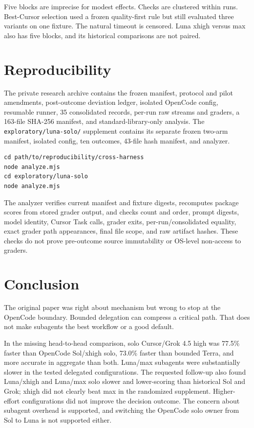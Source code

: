 \documentclass[11pt,oneside]{article}
\begin{document}
Five blocks are imprecise for modest effects. Checks are clustered within runs.
Best-Cursor selection used a frozen quality-first rule but still evaluated
three variants on one fixture. The natural timeout is censored. Luna xhigh
versus max also has five blocks, and its historical comparisons are not paired.

\section{Reproducibility}

The private research archive contains the frozen manifest, protocol and pilot amendments,
post-outcome deviation ledger, isolated OpenCode config, resumable runner, 35
consolidated records, per-run raw streams and graders, a 163-file SHA-256
manifest, and standard-library-only analysis. The
\texttt{exploratory/luna-solo/} supplement contains its separate frozen two-arm
manifest, isolated config, ten outcomes, 43-file hash manifest, and analyzer.

\begin{lstlisting}[style=config]
cd path/to/reproducibility/cross-harness
node analyze.mjs
cd exploratory/luna-solo
node analyze.mjs
\end{lstlisting}

The analyzer verifies current manifest and fixture digests, recomputes package
scores from stored grader output, and checks count and order, prompt digests,
model identity, Cursor Task calls, grader exits, per-run/consolidated equality,
exact grader path appearances, final file scope, and raw artifact hashes. These
checks do not prove pre-outcome source immutability or OS-level non-access to
graders.

\section{Conclusion}

The original paper was right about mechanism but wrong to stop at the OpenCode
boundary. Bounded delegation can compress a critical path. That does not make
subagents the best workflow or a good default.

In the missing head-to-head comparison, solo Cursor/Grok 4.5 high was 77.5\%
faster than OpenCode Sol/xhigh solo, 73.0\% faster than bounded Terra, and more
accurate in aggregate than both. Luna/max subagents were substantially slower in
the tested delegated configurations. The requested follow-up also found Luna/xhigh and Luna/max solo slower and
lower-scoring than historical Sol and Grok; xhigh did not clearly beat max in
the randomized supplement. Higher-effort configurations did not improve the
decision outcome. The concern about subagent overhead is supported, and
switching the OpenCode solo owner from Sol to Luna is not supported either.
\end{document}
